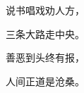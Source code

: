 \documentclass[a4paper, 12pt, UTF8]{ctexart}
\begin{document}
{ \centering
  说书唱戏劝人方，\par
  三条大路走中央。\par
  善恶到头终有报，\par
  人间正道是沧桑。\par
}
\end{document}
